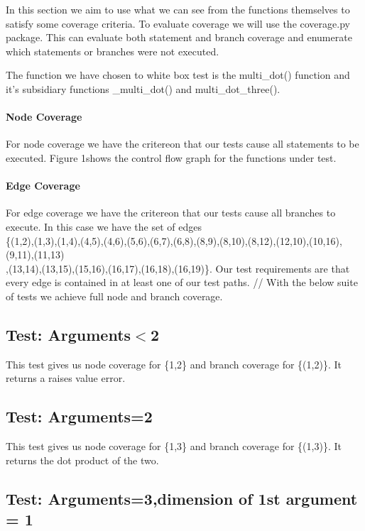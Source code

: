 In this section we aim to use what we can see from the functions themselves to satisfy some coverage
criteria. To evaluate coverage we will use the coverage.py package. This can evaluate both statement and branch coverage and enumerate which statements or branches were not executed.

The function we have chosen to white box test is the multi\_dot() function and it's subsidiary functions \_multi\_dot() and multi\_dot\_three().

\paragraph{Node Coverage}


For node coverage we have the critereon that our tests cause all statements to be executed. Figure 1shows the control flow graph for the functions under test. 



\paragraph{Edge Coverage}

For edge coverage we have the critereon that our tests cause all branches to execute. In this case we have the set of edges \\
\{(1,2),(1,3),(1,4),(4,5),(4,6),(5,6),(6,7),(6,8),(8,9),(8,10),(8,12),(12,10),(10,16),(9,11),(11,13)\\
,(13,14),(13,15),(15,16),(16,17),(16,18),(16,19)\}.
Our test requirements are that every edge is contained in at least one of our test paths.
//
With the below suite of tests we achieve full node and branch coverage.
\subsection{Test: Arguments$<$2}

This test gives us node coverage for \{1,2\} and branch coverage for \{(1,2)\}. It returns a raises value error.

\subsection{Test: Arguments=2}

This test gives us node coverage for \{1,3\} and branch coverage for \{(1,3)\}. It returns the dot product of the two.


\subsection{Test: Arguments=3,dimension of 1st argument = 1}

